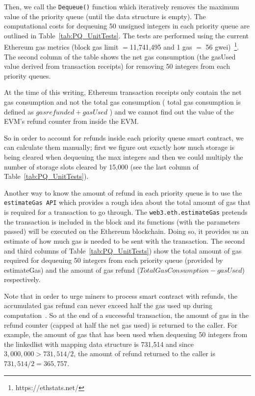 
Then, we call the \texttt{Dequeue()} function which iteratively removes the maximum value of the priority queue (until the data structure is empty). The computational costs for dequeuing 50 unsigned integers in each priority queue are outlined in Table~\ref{tab:PQ_UnitTests}. The tests are performed using the current Ethereum gas metrics (block gas limit $=$11,741,495 and 1 gas $=$ 56 gwei)~\footnote{https://ethstats.net/}. The second column of the table shows the net gas consumption (the gasUsed value derived from transaction receipts) for removing 50 integers from each priority queues.  

At the time of this writing, Ethereum transaction receipts only contain the net gas consumption and not the total gas consumption ( total gas consumption is defined as $gas refunded + gasUsed$ ) and we cannot find out the value of the EVM's refund counter from inside the EVM.

So in order to account for refunds inside each priority queue smart contract, we can calculate them manually; first we figure out exactly how much storage is being cleared when dequeuing  the max integers and then we could multiply the number of storage slots cleared by 15,000 (see the last column of Table~\ref{tab:PQ_UnitTests}).

Another way to know the amount of refund in each priority queue is to use the \texttt{estimateGas API} which provides a rough idea about the total amount of gas that is required for a transaction to go through. The \texttt{web3.eth.estimateGas} pretends the transaction is included in the block and its functions (with the parameters passed) will be executed on the Ethereum blockchain. Doing so, it provides us an estimate of how much gas is needed to be sent with the transaction. The second and third columns of Table~\ref{tab:PQ_UnitTests}) show the total amount of gas required for dequeuing 50 integers from each priority queue (provided by estimateGas) and the amount of gas refund ($Total Gas Consumption - gasUsed$) respectively.

Note that in order to urge miners to process smart contract with refunds, the accumulated gas refund can never exceed half the gas used up during computation~\cite{wood2014ethereum}. So at the end of a successful transaction, the amount of gas in the refund counter (capped at half the net gas used) is returned to the caller. For example, the amount of gas that has been used when dequeuing 50 integers from the linkedlist with mapping data structure is 731,514 and since $3,000,000 > 731,514/2$, the amount of refund returned to the caller is $731,514/2 = 365,757$.

